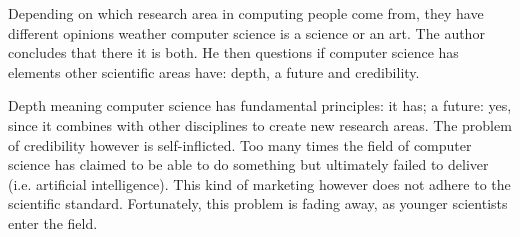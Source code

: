 \documentclass[a4paper,12pt,english]{scrartcl}
\begin{document}
Depending on which research area in computing people come from, they have
different opinions weather computer science is a science or an art. The author
concludes that there it is both. He then questions if computer science has
elements other scientific areas have: depth, a future and credibility.

Depth meaning computer science has fundamental principles: it has; a future:
yes, since it combines with other disciplines to create new research areas.
The problem of credibility however is self-inflicted. Too many times the field
of computer science has claimed to be able to do something but ultimately
failed to deliver (i.e. artificial intelligence). This kind of marketing
however does not adhere to the scientific standard. Fortunately, this problem
is fading away, as younger scientists enter the field.
\end{document}
